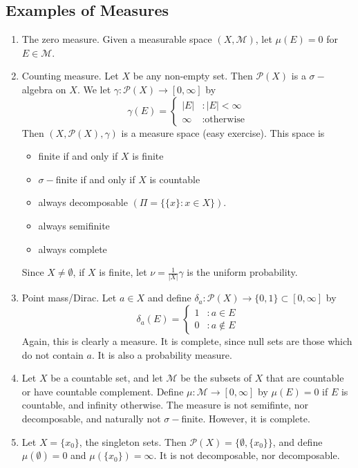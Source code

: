 \documentclass[12pt, a4paper]{memoir}
\theoremstyle{nonumberplain}
\begin{document}
\subsection{Examples of Measures}
\begin{enumerate}
    \item The zero measure.
        Given a measurable space $(X,\mathcal{M})$, let $\mu(E)=0$ for $E\in\mathcal{M}$.
    \item Counting measure.
        Let $X$ be any non-empty set.
        Then $\mathcal{P}(X)$ is a $\sigma-$algebra on $X$.
        We let $\gamma:\mathcal{P}(X)\to[0,\infty]$ by
        \begin{equation*}
            \gamma(E)=
            \begin{cases}
                |E| &: |E|<\infty\\
                \infty &: \text{otherwise}
            \end{cases}
        \end{equation*}
        Then $(X,\mathcal{P}(X),\gamma)$ is a measure space (easy exercise).
        This space is
        \begin{itemize}[nolistsep]
            \item finite if and only if $X$ is finite
            \item $\sigma-$finite if and only if $X$ is countable
            \item always decomposable $(\Pi=\{\{x\}:x\in X\})$.
            \item always semifinite
            \item always complete
        \end{itemize}
        Since $X\neq\emptyset$, if $X$ is finite, let $\nu=\frac{1}{|X|}\gamma$ is the uniform probability.
    \item Point mass/Dirac.
        Let $a\in X$ and define $\delta_a:\mathcal{P}(X)\to\{0,1\}\subset[0,\infty]$ by
        \begin{equation*}
            \delta_a(E)=
            \begin{cases}
                1 &: a\in E\\
                0 &: a\notin E
            \end{cases}
        \end{equation*}
        Again, this is clearly a measure.
        It is complete, since null sets are those which do not contain $a$.
        It is also a probability measure.
    \item Let $X$ be a countable set, and let $\mathcal{M}$ be the subsets of $X$ that are countable or have countable complement.
        Define $\mu:\mathcal{M}\to[0,\infty]$ by $\mu(E)=0$ if $E$ is countable, and infinity otherwise.
        The measure is not semifinte, nor decomposable, and naturally not $\sigma-$finite.
        However, it is complete.
    \item Let $X=\{x_0\}$, the singleton sets.
        Then $\mathcal{P}(X)=\{\emptyset,\{x_0\}\}$, and define $\mu(\emptyset)=0$ and $\mu(\{x_0\})=\infty$.
        It is not decomposable, nor decomposable.
\end{enumerate}
\end{document}
